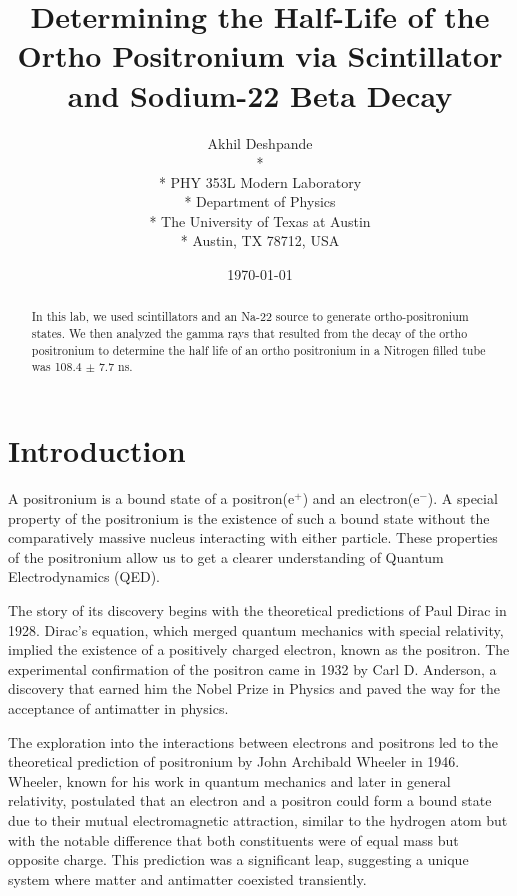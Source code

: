 \documentclass[10pt,letterpaper]{article}
\begin{document}
\title{Determining the Half-Life of the Ortho Positronium via Scintillator and Sodium-22 Beta Decay}


\author{
 Akhil Deshpande \\*
  \\*
 PHY 353L Modern Laboratory \\*
 Department of Physics \\*
 The University of Texas at Austin \\*
 Austin, TX 78712, USA
}
\date{\today}

\maketitle

\begin{abstract}
   In this lab, we used scintillators and an Na-22 source to generate ortho-positronium states. We then analyzed the 
   gamma rays that resulted from the decay of the ortho positronium to determine the half life of an ortho positronium in a 
   Nitrogen filled tube was 108.4 $\pm$ 7.7 ns.
\end{abstract}

\section{Introduction}
A positronium is a bound state of a positron($\text{e}^+$) and an electron($\text{e}^-$). \cite{Zute:2018}
A special property of the positronium is the existence of such a bound state without the comparatively massive
nucleus interacting with either particle. These properties of the positronium allow us to get a clearer understanding
of Quantum Electrodynamics (QED).

The story of its discovery begins with the theoretical predictions of 
Paul Dirac in 1928. Dirac's equation, which 
merged quantum mechanics with special relativity, 
implied the existence of a positively charged electron, 
known as the positron. 
The experimental confirmation of the positron came in 1932 by 
Carl D. Anderson, a discovery that earned him the Nobel Prize in 
Physics and paved the way for the acceptance of antimatter in physics.

The exploration into the interactions between electrons and positrons 
led to the theoretical prediction of positronium by 
John Archibald Wheeler in 1946. Wheeler, known for his work in 
quantum mechanics and later in general relativity, postulated that 
an electron and a positron could form a bound state due to their mutual 
electromagnetic attraction, 
similar to the hydrogen atom but with the notable 
difference that both constituents were of equal mass but opposite charge. 
This prediction was a significant leap, suggesting a unique system 
where matter and antimatter coexisted transiently.
\end{document}
